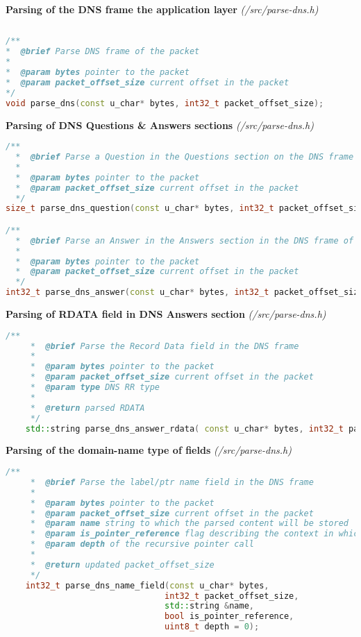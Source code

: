 \pagebreak

\vspace{1cm}
\textbf{Parsing of the DNS frame the application layer} \textit{(/src/parse-dns.h)}
\begin{lstlisting}[language=C++] 
   
/**
*  @brief Parse DNS frame of the packet
* 
*  @param bytes pointer to the packet
*  @param packet_offset_size current offset in the packet
*/
void parse_dns(const u_char* bytes, int32_t packet_offset_size);

\end{lstlisting}

\vspace{1cm}
\textbf{Parsing of DNS Questions \& Answers sections} \textit{(/src/parse-dns.h)}
\begin{lstlisting}[language=C++] 
/**
  *  @brief Parse a Question in the Questions section on the DNS frame of the packet
  * 
  *  @param bytes pointer to the packet
  *  @param packet_offset_size current offset in the packet
  */
size_t parse_dns_question(const u_char* bytes, int32_t packet_offset_size);

/**
  *  @brief Parse an Answer in the Answers section in the DNS frame of the packet
  * 
  *  @param bytes pointer to the packet
  *  @param packet_offset_size current offset in the packet
  */
int32_t parse_dns_answer(const u_char* bytes, int32_t packet_offset_size);
\end{lstlisting}

\vspace{1cm}
\textbf{Parsing of RDATA field in DNS Answers section} \textit{(/src/parse-dns.h)}
\begin{lstlisting}[language=C++] 
    /**
     *  @brief Parse the Record Data field in the DNS frame 
     * 
     *  @param bytes pointer to the packet
     *  @param packet_offset_size current offset in the packet
     *  @param type DNS RR type 
     *  
     *  @return parsed RDATA
     */
    std::string parse_dns_answer_rdata( const u_char* bytes, int32_t packet_offset_size, uint16_t rdata_length, uint16_t type);
\end{lstlisting}

\pagebreak

\vspace{1cm}
\textbf{Parsing of the domain-name type of fields} \textit{(/src/parse-dns.h)}
\begin{lstlisting}[language=C++]
    /**
     *  @brief Parse the label/ptr name field in the DNS frame
     * 
     *  @param bytes pointer to the packet
     *  @param packet_offset_size current offset in the packet
     *  @param name string to which the parsed content will be stored
     *  @param is_pointer_reference flag describing the context in which the name parsing is run
     *  @param depth of the recursive pointer call
     * 
     *  @return updated packet_offset_size
     */
    int32_t parse_dns_name_field(const u_char* bytes, 
                                int32_t packet_offset_size, 
                                std::string &name, 
                                bool is_pointer_reference,
                                uint8_t depth = 0);
\end{lstlisting}


